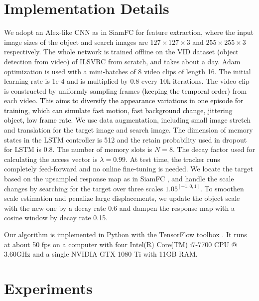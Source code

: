 \documentclass[runningheads]{llncs}
\newcommand{\yty}[1]{\textcolor{black}{#1}}
\newcommand{\ytyy}[1]{\textcolor{black}{#1}}
\newcommand{\abc}[1]{\textcolor{black}{#1}}
\begin{document}
\section{Implementation Details}
We adopt an Alex-like CNN as in SiamFC \cite{Bertinetto2016} for feature extraction, where the input image sizes of the object  and search images are $127\times 127 \times 3$ and $255 \times 255 \times 3$ respectively. The whole network is trained offline on the VID dataset (object detection from video) of ILSVRC \cite{ILSVRC15} from scratch, and takes about a day. %
Adam \cite{kingma2014adam} optimization is used with a mini-batches of 8 video clips of length 16. The initial learning rate is 1e-4 and is multiplied by 0.8 every 10k iterations. The video clip is constructed by %
uniformly sampling frames \abc{(keeping the temporal order)} from each video. \ytyy{This aims to diversify the appearance variations in one episode for training, which can simulate fast motion, fast background change, jittering object, low frame rate.}
We use data augmentation, including small image stretch and translation for the target image and search image. 
The dimension of memory states in the LSTM controller is 512 and the retain probability used in dropout for LSTM is 0.8. The number of memory slots is $N=8$. The decay factor used for calculating the access vector is $\lambda=0.99$.
%
At test time, the tracker runs completely feed-forward and no online fine-tuning is needed. We locate the target based on the upsampled response map as in SiamFC \cite{Bertinetto2016}, and handle the scale changes by searching for the target over three scales $1.05^{[-1,0,1]}$. To smoothen scale estimation and penalize large displacements, we update the object scale with the new one by a decay rate 0.6 and dampen the response map with a cosine window by decay rate 0.15.

Our algorithm is implemented in Python with the TensorFlow toolbox \cite{abadi2016tensorflow}. It runs at about 50 fps on a computer with four Intel(R) Core(TM) i7-7700 CPU @ 3.60GHz and a single NVIDIA GTX 1080 Ti with 11GB RAM.


\section{Experiments}
\end{document}
